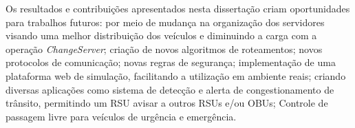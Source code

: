 \documentclass[
	12pt,				%
	oneside,			%
	a4paper,			%
	english,			%
	brazil				%
	]{abntex2ppgsi}
\begin{document}




Os resultados e contribuições apresentados nesta dissertação criam oportunidades para trabalhos futuros: por meio de mudança na organização dos servidores visando uma melhor distribuição dos veículos e diminuindo a carga com a operação \textit{ChangeServer}; criação de novos algoritmos de roteamentos; novos protocolos de comunicação; novas regras de segurança; implementação de uma plataforma web de simulação, facilitando a utilização em ambiente reais;  criando diversas aplicações como sistema de detecção e alerta de congestionamento de trânsito, permitindo um RSU avisar a outros RSUs e/ou OBUs; Controle de passagem livre para veículos de urgência e emergência.


\postextual



%
%






\end{document}
